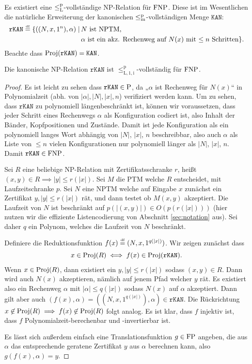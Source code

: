 Es existiert eine $\leqlp$-vollständige NP-Relation für $\FNP$. Diese ist im Wesentlichen die natürliche Erweiterung der kanonischen $\leqmp$-vollständigen Menge $\mathtt{KAN}$:
\[ \begin{split} \mathtt{rKAN} \defeq \{ ((N,x,1^n), \alpha) \mid\, &\text{$N$ ist NPTM,}\\ &\text{$\alpha$ ist ein akz. Rechenweg auf $N(x)$ mit $\leq n$ Schritten} \}.\end{split} \]
Beachte dass $\Proj(\mathtt{rKAN})=\mathtt{KAN}$.
\begin{theorem}
    Die kanonische NP-Relation $\mathtt{rKAN}$ 
    ist $\leq_\mathrm{L,1,i}^\mathrm p$-vollständig für $\FNP$.
\end{theorem}
\begin{proof}
    Es ist leicht zu sehen dass $\mathtt{rKAN}\in\P$, da „$\alpha$ ist Rechenweg für $N(x)$“ in Polynomialzeit (abh. von $|\alpha|, |N|, |x|, n$) verifiziert werden kann. Um zu sehen, dass  $\mathtt{rKAN}$ zu polynomiell längenbeschränkt ist, können wir voraussetzen, dass jeder Schritt eines Rechenwegs $\alpha$ als Konfiguration codiert ist, also Inhalt der Bänder, Kopfpositionen und Zustände. Damit ist jede Konfiguration als ein polynomiell langes Wort abhängig von $|N|$, $|x|$, $n$ beschreibbar, also auch $\alpha$ als Liste von $\leq n$ vielen Konfigurationen nur polynomiell länger als $|N|$, $|x|$, $n$.
    Damit $\mathtt{rKAN}\in\FNP$.

    Sei $R$ eine beliebige NP-Relation mit Zertifikatsschranke $r$, heißt $(x,y)\in R\implies |y|\leq r(|x|)$. Sei $M$ die PTM welche $R$ entscheidet, mit Laufzeitschranke $p$. Sei $N$ eine NPTM welche auf Eingabe $x$ zunächst ein Zertifikat $y, |y|\leq r(|x|)$ rät, und dann testet ob $M(x,y)$ akzeptiert. Die Laufzeit von $N$ ist beschränkt auf $p(|(x,y)|)\in O(p(r(|x|)))$ (hier nutzen wir die effiziente Listencodierung von Abschnitt \ref{sec:notation} aus). Sei daher $q$ ein Polynom, welches die Laufzeit von $N$ beschränkt.

    Definiere die Reduktionsfunktion $f(x)\defeq(N, x, 1^{q(|x|)})$. Wir zeigen zunächst dass
    \[ x\in \Proj(R)\iff f(x)\in \Proj(\mathtt{rKAN}). \]
    Wenn $x\in\Proj(R)$, dann existiert ein $y, |y|\leq r(|x|)$ sodass $(x,y)\in R$. Dann wird auch $N(x)$ akzeptieren, nämlich auf jenem Pfad welcher $y$ rät. Es existiert also ein Rechenweg $\alpha$ mit $|\alpha|\leq q(|x|)$ sodass $N(x)$ auf $\alpha$ akzeptiert. Dann gilt aber auch $(f(x), \alpha)=((N,x,1^{q(|x|)}),\alpha)\in \mathtt{rKAN}$.
    Die Rückrichtung $x\not\in \Proj(R)\implies f(x)\not\in\Proj(R)$ folgt analog.
    Es ist klar, dass $f$ injektiv ist, dass $f$ Polynomialzeit-berechenbar und -invertierbar ist. 

    Es lässt sich außerdem einfach eine Translationsfunktion $g\in \FP$ angeben, die  aus $\alpha$ das entsprechende geratene Zertifikat $y$ aus $\alpha$ berechnen kann, also $g(f(x), \alpha)=y$.
\end{proof}


